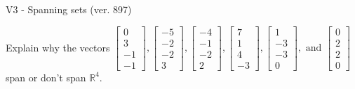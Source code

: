 \begin{exercise}
  \begin{exerciseTitle}V3 - Spanning sets (ver. 897)\end{exerciseTitle}
  \begin{exerciseStatement}
    Explain why the vectors \(\left[\begin{array}{r}
0 \\
3 \\
-1 \\
-1
\end{array}\right] , \left[\begin{array}{r}
-5 \\
-2 \\
-2 \\
3
\end{array}\right] , \left[\begin{array}{r}
-4 \\
-1 \\
-2 \\
2
\end{array}\right] , \left[\begin{array}{r}
7 \\
1 \\
4 \\
-3
\end{array}\right] , \left[\begin{array}{r}
1 \\
-3 \\
-3 \\
0
\end{array}\right] , \text{ and } \left[\begin{array}{r}
0 \\
2 \\
2 \\
0
\end{array}\right]\) span or don't span \(\mathbb{R}^4\). 
	



\end{exerciseStatement}
\end{exercise}
